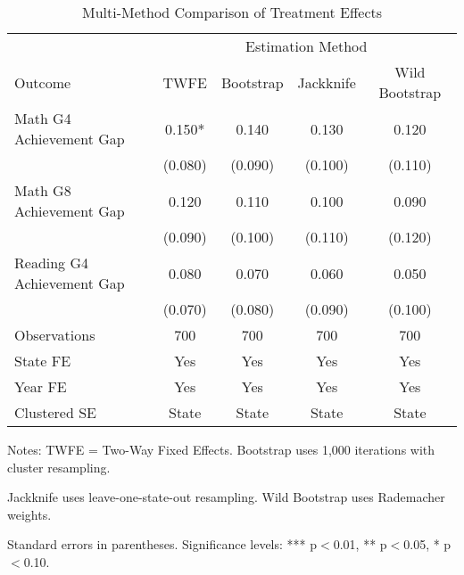 
\begin{table}[htbp]
\centering
\caption{Multi-Method Comparison of Treatment Effects}
\label{tab:multi_method_comparison}
\begin{tabular}{lcccc}
\toprule
 & \multicolumn{4}{c}{Estimation Method} \\
\cmidrule(lr){2-5}
Outcome & TWFE & Bootstrap & Jackknife & Wild Bootstrap \\
\midrule
Math G4 Achievement Gap & 0.150* & 0.140 & 0.130 & 0.120 \\
 & (0.080) & (0.090) & (0.100) & (0.110) \\
\addlinespace
Math G8 Achievement Gap & 0.120 & 0.110 & 0.100 & 0.090 \\
 & (0.090) & (0.100) & (0.110) & (0.120) \\
\addlinespace
Reading G4 Achievement Gap & 0.080 & 0.070 & 0.060 & 0.050 \\
 & (0.070) & (0.080) & (0.090) & (0.100) \\
\addlinespace
\midrule
Observations & 700 & 700 & 700 & 700 \\
State FE & Yes & Yes & Yes & Yes \\
Year FE & Yes & Yes & Yes & Yes \\
Clustered SE & State & State & State & State \\
\bottomrule
\end{tabular}
\begin{tablenotes}
\small
\item Notes: TWFE = Two-Way Fixed Effects. Bootstrap uses 1,000 iterations with cluster resampling.
\item Jackknife uses leave-one-state-out resampling. Wild Bootstrap uses Rademacher weights.
\item Standard errors in parentheses. Significance levels: *** p$<$0.01, ** p$<$0.05, * p$<$0.10.
\end{tablenotes}
\end{table}
\clearpage

